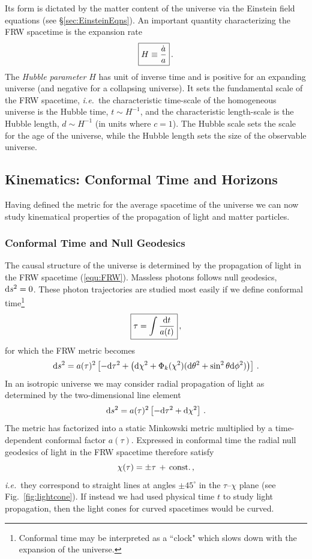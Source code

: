 \documentclass[12pt,letterpaper,rotate]{article}
\def\beq{\begin{equation}}
\def\eeq{\end{equation}}
\def\d{{\rm d}}
\begin{document}
{Its form is dictated by the matter content of the universe via the Einstein field equations (see \S\ref{sec:EinsteinEqns}).
An important quantity characterizing the FRW spacetime is the expansion rate
\beq
\fbox{$\displaystyle
H \equiv \frac{\dot a }{a} $}\, .
\eeq
The {\it Hubble parameter} $H$ has unit of inverse time and is positive for an expanding universe (and negative for a collapsing universe).
It sets the fundamental scale of the FRW spacetime, {\it i.e.}~the characteristic time-scale of the homogeneous universe is the Hubble time, $t\sim H^{-1}$, and the characteristic length-scale is the Hubble length, $d \sim H^{-1}$ (in units where $c=1$). The Hubble scale sets the scale for the age of the universe, while the Hubble length sets the size of the observable universe. 


\subsection{Kinematics: Conformal Time and Horizons}

Having defined the metric for the average spacetime of the universe we can now study kinematical properties of the propagation of light and matter particles.

\subsubsection*{Conformal Time and Null Geodesics}

The causal structure of the universe is determined by the propagation of light in the FRW spacetime (\ref{equ:FRW}).  Massless photons follows null geodesics, $\d s^2 = 0$. These photon trajectories are studied most easily if we define 
conformal time\footnote{Conformal time may be interpreted as a ``clock" which slows down with the expansion of the universe.}
\beq
\fbox{$\displaystyle
\tau = \int \frac{\d t}{a(t)} $}\, ,
\eeq
for which the FRW metric becomes
\beq
\d s^2 =a(\tau)^2 \left[- \d \tau^2 +  \left(\d \chi^2 + \Phi_k(\chi^2) (\d \theta^2 + \sin^2 \theta \d \phi^2) \right) \right] \, .
\eeq
In an isotropic universe we may consider radial propagation of light as determined by the two-dimensional line element
\beq
\d s^2 = a(\tau)^2 \left[ - \d \tau^2 + \d \chi^2\right]\, .
\eeq
The metric has factorized into a static Minkowski metric multiplied by a time-dependent conformal factor $a(\tau)$.
Expressed in conformal time the radial null geodesics of light in the FRW spacetime therefore satisfy
\beq
\chi(\tau) = \pm \tau\, +\, {\rm const.}\, ,
\eeq
{\it i.e.}~they correspond to straight lines at angles $\pm 45^\circ$ in the $\tau$--$\chi$ plane (see Fig.~\ref{fig:lightcone}).
If instead we had used physical time $t$ to study light propagation, then the light cones for curved spacetimes would be curved. 

}
\end{document}
